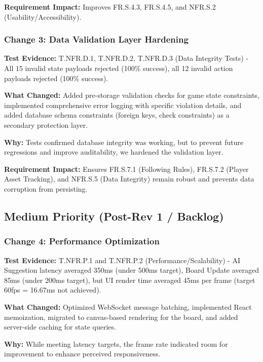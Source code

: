\documentclass[12pt, titlepage]{article}
\begin{document}
\noindent
\textbf{Requirement Impact:} Improves FR.S.4.3, FR.S.4.5, and NFR.S.2 (Usability/Accessibility).

\subsubsection*{Change 3: Data Validation Layer Hardening}

\noindent
\textbf{Test Evidence:} T.NFR.D.1, T.NFR.D.2, T.NFR.D.3 (Data Integrity Tests) - All 15 invalid state payloads rejected (100\% success), all 12 invalid action payloads rejected (100\% success).

\noindent
\textbf{What Changed:} Added pre-storage validation checks for game state constraints, implemented comprehensive error logging with specific violation details, and added database schema constraints (foreign keys, check constraints) as a secondary protection layer.

\noindent
\textbf{Why:} Tests confirmed database integrity was working, but to prevent future regressions and improve auditability, we hardened the validation layer.

\noindent
\textbf{Requirement Impact:} Ensures FR.S.7.1 (Following Rules), FR.S.7.2 (Player Asset Tracking), and NFR.S.5 (Data Integrity) remain robust and prevents data corruption from persisting.

\subsection*{Medium Priority (Post-Rev 1 / Backlog)}

\subsubsection*{Change 4: Performance Optimization}

\noindent
\textbf{Test Evidence:} T.NFR.P.1 and T.NFR.P.2 (Performance/Scalability) - AI Suggestion latency averaged 350ms (under 500ms target), Board Update averaged 85ms (under 200ms target), but UI render time averaged 45ms per frame (target 60fps = 16.67ms not achieved).

\noindent
\textbf{What Changed:} Optimized WebSocket message batching, implemented React memoization, migrated to canvas-based rendering for the board, and added server-side caching for state queries.

\noindent
\textbf{Why:} While meeting latency targets, the frame rate indicated room for improvement to enhance perceived responsiveness.
\end{document}
